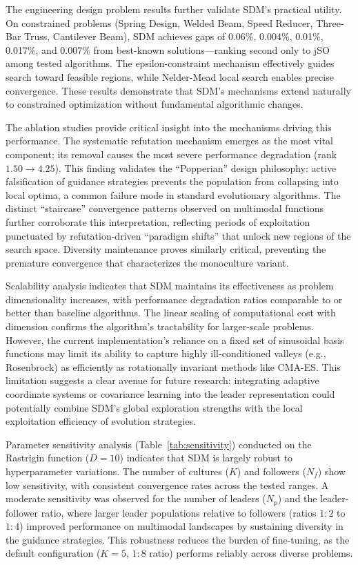 \documentclass[11pt]{article}
\begin{document}
The engineering design problem results further validate SDM's practical utility. On constrained problems (Spring Design, Welded Beam, Speed Reducer, Three-Bar Truss, Cantilever Beam), SDM achieves gaps of 0.06\%, 0.004\%, 0.01\%, 0.017\%, and 0.007\% from best-known solutions---ranking second only to jSO among tested algorithms. The epsilon-constraint mechanism effectively guides search toward feasible regions, while Nelder-Mead local search enables precise convergence. These results demonstrate that SDM's mechanisms extend naturally to constrained optimization without fundamental algorithmic changes.

The ablation studies provide critical insight into the mechanisms driving this performance. The systematic refutation mechanism emerges as the most vital component; its removal causes the most severe performance degradation (rank $1.50 \to 4.25$). This finding validates the ``Popperian'' design philosophy: active falsification of guidance strategies prevents the population from collapsing into local optima, a common failure mode in standard evolutionary algorithms. The distinct ``staircase'' convergence patterns observed on multimodal functions further corroborate this interpretation, reflecting periods of exploitation punctuated by refutation-driven ``paradigm shifts'' that unlock new regions of the search space. Diversity maintenance proves similarly critical, preventing the premature convergence that characterizes the monoculture variant.

Scalability analysis indicates that SDM maintains its effectiveness as problem dimensionality increases, with performance degradation ratios comparable to or better than baseline algorithms. The linear scaling of computational cost with dimension confirms the algorithm's tractability for larger-scale problems. However, the current implementation's reliance on a fixed set of sinusoidal basis functions may limit its ability to capture highly ill-conditioned valleys (e.g., Rosenbrock) as efficiently as rotationally invariant methods like CMA-ES. This limitation suggests a clear avenue for future research: integrating adaptive coordinate systems or covariance learning into the leader representation could potentially combine SDM's global exploration strengths with the local exploitation efficiency of evolution strategies.

Parameter sensitivity analysis (Table~\ref{tab:sensitivity}) conducted on the Rastrigin function ($D=10$) indicates that SDM is largely robust to hyperparameter variations. The number of cultures ($K$) and followers ($N_f$) show low sensitivity, with consistent convergence rates across the tested ranges. A moderate sensitivity was observed for the number of leaders ($N_p$) and the leader-follower ratio, where larger leader populations relative to followers (ratios $1:2$ to $1:4$) improved performance on multimodal landscapes by sustaining diversity in the guidance strategies. This robustness reduces the burden of fine-tuning, as the default configuration ($K=5$, $1:8$ ratio) performs reliably across diverse problems.
\end{document}

